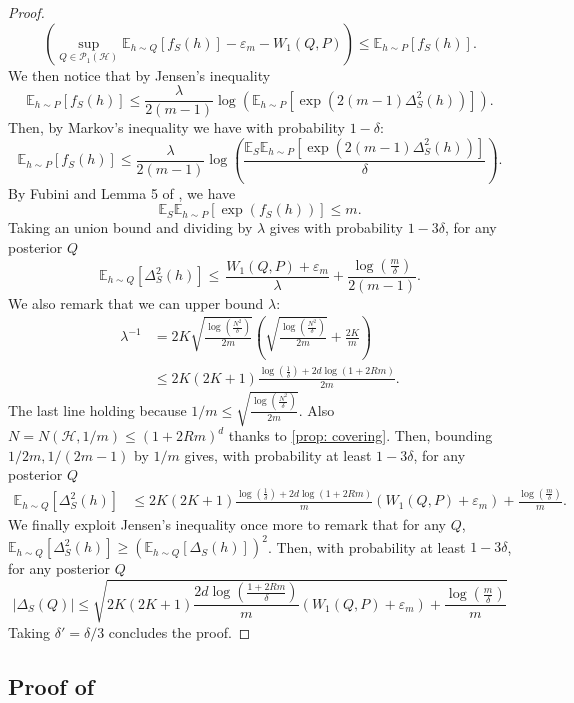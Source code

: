 \begin{noaddcontents}
\begin{proof}
\[ \left(\sup_{Q\in \mathcal{P}_1(\mathcal{H})} \mathbb{E}_{h\sim Q}[ f_S(h)] - \varepsilon_m - W_1(Q,P) \right) \leq \mathbb{E}_{h\sim P}[ f_S(h)]. \]
We then notice that by Jensen's inequality
$$\mathbb{E}_{h\sim P}[ f_S(h)] \leq \frac{\lambda}{2(m-1)}\log\left(\mathbb{E}_{h\sim P}[ \exp(2(m-1)\Delta_S^2(h))]    \right).$$
Then, by Markov's inequality we have with probability $1-\delta$:
\[ \mathbb{E}_{h\sim P}[ f_S(h)] \leq \frac{\lambda}{2(m-1)} \log\left(\frac{\mathbb{E}_S\mathbb{E}_{h\sim P}\left[ \exp\left(2(m-1)\Delta_S^2(h)\right) \right]}{\delta}\right).  \]
By Fubini and Lemma 5 of \citet{mcallester2003simplified}, we have
\[ \mathbb{E}_S\mathbb{E}_{h\sim P}\left[ \exp(f_S(h))\right] \leq m. \]
Taking an union bound and dividing by $\lambda$ gives with probability $1-3\delta$, for any posterior $Q$
\[ \mathbb{E}_{h\sim Q}[\Delta_S^2(h)] \leq \frac{}{}  \frac{W_1(Q,P)+\varepsilon_m}{\lambda} + \frac{\log\left( \frac{m}{\delta} \right)}{2(m-1)}.   \]
We also remark that we can upper bound $\lambda$:
\begin{align*}
\lambda^{-1} & =  2K\sqrt{\frac{\log(\frac{N^2}{\delta})}{2m}}\left(\sqrt{\frac{\log(\frac{N^2}{\delta})}{2m}} + \frac{2K}{m} \right)\\
& \leq 2K(2K+1)\frac{\log(\frac{1}{\delta}) + 2d\log\left(1 +2Rm \right)}{2m}.
\end{align*}
The last line holding because $1/m \leq \sqrt{\frac{\log(\frac{N^2}{\delta})}{2m}}$. Also $N= N(\mathcal{H},1/m) \leq (1+2Rm)^d$ thanks to \cref{prop: covering}.
Then, bounding $1/2m, 1/(2m-1)$ by $1/m$ gives, with probability at least $1-3\delta$, for any posterior $Q$
\begin{align*}
\mathbb{E}_{h\sim Q}[\Delta_S^2(h)] & \leq  2K(2K+1) \frac{\log(\frac{1}{\delta}) + 2d\log\left(1 +2Rm \right)}{m} \left(W_1(Q,P)+\varepsilon_m \right) + \frac{\log\left( \frac{m}{\delta} \right)}{m}.
\end{align*}
We finally exploit Jensen's inequality once more to remark that for any $Q$, $\mathbb{E}_{h\sim Q}[\Delta_S^2(h)] \geq \left(\mathbb{E}_{h\sim Q}[\Delta_S(h)]  \right)^2$.
Then, with probability at least $1-3\delta$, for any posterior $Q$
\[ |\Delta_S(Q)| \leq \sqrt{2K(2K+1)\frac{2d\log\left(\frac{1 +2Rm }{\delta}\right)}{m} \left(W_1(Q,P)+\varepsilon_m \right) + \frac{\log\left( \frac{m}{\delta} \right)}{m}   } \]
Taking $\delta'= \delta/3$ concludes the proof.
\end{proof}

\subsection{Proof of }
\label{sec: proof_gaussian_tail}


\end{noaddcontents}
